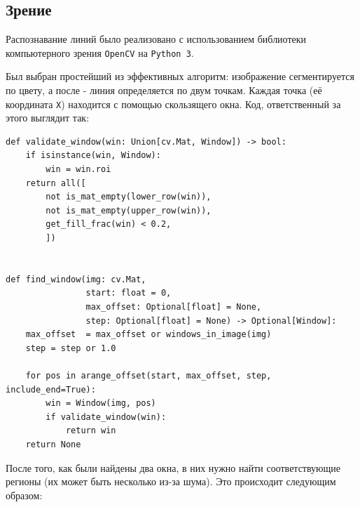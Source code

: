\documentclass[11pt]{article}
\begin{document}
\subsection{Зрение}
\label{sec:orgeee9851}
Распознавание линий было реализовано с использованием библиотеки компьютерного зрения \texttt{OpenCV} на \texttt{Python 3}.

Был выбран простейший из эффективных алгоритм: изображение сегментируется по цвету, а после - линия определяется по двум точкам. Каждая точка (её координата \texttt{X}) находится с помощью скользящего окна. Код, ответственный за этого выглядит так:
\begin{verbatim}
def validate_window(win: Union[cv.Mat, Window]) -> bool:
    if isinstance(win, Window):
        win = win.roi
    return all([
        not is_mat_empty(lower_row(win)),
        not is_mat_empty(upper_row(win)),
        get_fill_frac(win) < 0.2,
        ])


def find_window(img: cv.Mat,
                start: float = 0,
                max_offset: Optional[float] = None,
                step: Optional[float] = None) -> Optional[Window]:
    max_offset  = max_offset or windows_in_image(img)
    step = step or 1.0

    for pos in arange_offset(start, max_offset, step, include_end=True):
        win = Window(img, pos)
        if validate_window(win):
            return win
    return None
\end{verbatim}
После того, как были найдены два окна, в них нужно найти соответствующие регионы (их может быть несколько из-за шума). Это происходит следующим образом:
\end{document}
